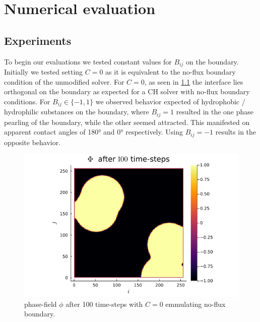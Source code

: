 \documentclass{mimosis}
\begin{document}
\chapter{Numerical evaluation}
\label{sec:org73ccefb}
\section{Experiments}
\label{sec:orga3536ba}
To begin our evaluations we tested constant values for \(B_{ij}\) on the boundary.
Initially we tested setting \(C=0\) as it is equivalent to the no-flux boundary condition of the unmodified solver. For \(C = 0\), as seen in \ref{fig:angle0} the interface lies orthogonal on the boundary as expected for a CH solver with no-flux boundary conditions.
For \(B_{ij} \in \{-1,1\}\) we observed behavior expected of hydrophobic / hydrophilic substances on the boundary, where \(B_{ij}=1\) resulted in the one phase pearling of the boundary, while the other seemed attracted. This manifested on apparent contact angles of 180° and 0° respectively. Using \(B_{ij} = -1\) results in the opposite behavior.


\begin{figure}[htbp]
\centering
\includegraphics[width=.9\linewidth]{images/baseline.png}
\caption{\label{fig:angle0}phase-field \(\phi\) after 100 time-steps with \(C=0\) emmulating no-flux boundary.}
\end{figure}
\end{document}
